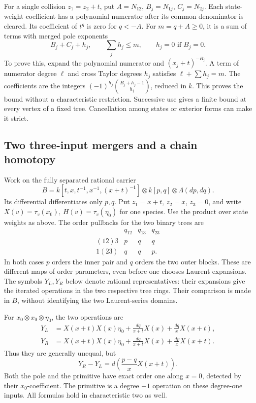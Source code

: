 For a single collision \(z_1=z_2+t\), put
\(A=N_{12}\), \(B_j=N_{1j}\), \(C_j=N_{2j}\).
Each state-weight coefficient has a polynomial numerator after its
common denominator is cleared.  Its coefficient of \(t^q\) is
zero for \(q<-A\).  For \(m=q+A\ge0\), it is a sum of terms
with merged pole exponents
\begin{equation}\label{fs:eq:state-pole-budget}
 B_j+C_j+h_j,\qquad \sum_jh_j\le m,\qquad h_j=0\text{ if }B_j=0.
\end{equation}
To prove this, expand the polynomial numerator and
\((x_j+t)^{-B_j}\).  A term of numerator degree \(\ell\)
and cross Taylor degrees \(h_j\) satisfies
\(\ell+\sum h_j=m\).  The coefficients are the integers
\((-1)^{h_j}\binom{B_j+h_j-1}{h_j}\), reduced in \(k\).
This proves the bound without a characteristic restriction.
Successive use gives a finite bound at every vertex of a fixed tree.
Cancellation among states or exterior forms can make it strict.

\subsection{Two three-input mergers and a chain homotopy}

Work on the fully separated rational carrier
\[
 B=k[t,x,t^{-1},x^{-1},(x+t)^{-1}]
       \otimes k[p,q]\otimes\Lambda(dp,dq).
\]
Its differential differentiates only \(p,q\).
Put \(z_1=x+t\), \(z_2=x\), \(z_3=0\), and write
\(X(v)=\tau_v(x_0)\), \(H(v)=\tau_v(\eta_0)\) for one species.
Use the product over state weights as above.
The order pullbacks for the two binary trees are
\[
 \begin{array}{c|ccc}
 &q_{12}&q_{13}&q_{23}\\\hline
 (12)3&p&q&q\\
 1(23)&q&q&p.
 \end{array}
\]
In both cases \(p\) orders the inner pair and \(q\) orders
the two outer blocks.  These are different maps of order parameters,
even before one chooses Laurent expansions.
The symbols \(Y_L,Y_R\) below denote rational representatives:
their expansions give the iterated operations in the two respective
tree rings.  Their comparison is made in \(B\), without identifying
the two Laurent-series domains.

\begin{example}\label{fs:ex:three-even-even-odd}
For \(x_0\otimes x_0\otimes\eta_0\), the two operations are
\[
 \begin{aligned}
 Y_L&=X(x+t)X(x)\eta_0+
       \frac{dq}{x+t}X(x)+\frac{dq}{x}X(x+t),\\
 Y_R&=X(x+t)X(x)\eta_0+
       \frac{dq}{x+t}X(x)+\frac{dp}{x}X(x+t).
 \end{aligned}
\]
Thus they are generally unequal, but
\begin{equation}\label{fs:eq:first-homotopy}
 Y_R-Y_L=d\left(\frac{p-q}{x}X(x+t)\right).
\end{equation}
Both the pole and the primitive have exact order one along \(x=0\),
detected by their \(x_0\)-coefficient.  The primitive is a degree
\(-1\) operation on these degree-one inputs.
All formulas hold in characteristic two as well.
\end{example}


